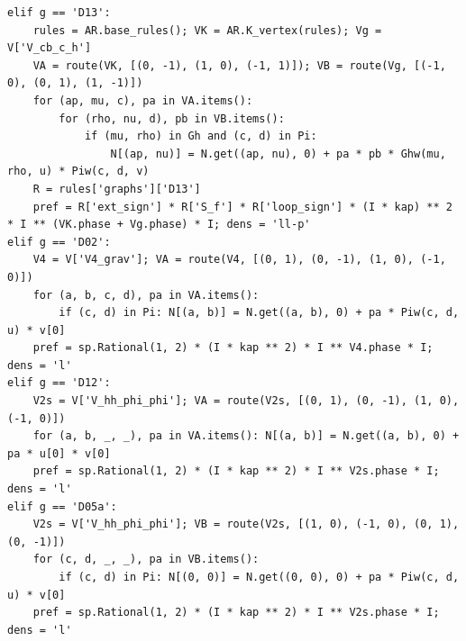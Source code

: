 \documentclass[10pt]{article}
\begin{document}
\begin{lstlisting}
elif g == 'D13':
    rules = AR.base_rules(); VK = AR.K_vertex(rules); Vg = V['V_cb_c_h']
    VA = route(VK, [(0, -1), (1, 0), (-1, 1)]); VB = route(Vg, [(-1, 0), (0, 1), (1, -1)])
    for (ap, mu, c), pa in VA.items():
        for (rho, nu, d), pb in VB.items():
            if (mu, rho) in Gh and (c, d) in Pi:
                N[(ap, nu)] = N.get((ap, nu), 0) + pa * pb * Ghw(mu, rho, u) * Piw(c, d, v)
    R = rules['graphs']['D13']
    pref = R['ext_sign'] * R['S_f'] * R['loop_sign'] * (I * kap) ** 2 * I ** (VK.phase + Vg.phase) * I; dens = 'll-p'
elif g == 'D02':
    V4 = V['V4_grav']; VA = route(V4, [(0, 1), (0, -1), (1, 0), (-1, 0)])
    for (a, b, c, d), pa in VA.items():
        if (c, d) in Pi: N[(a, b)] = N.get((a, b), 0) + pa * Piw(c, d, u) * v[0]
    pref = sp.Rational(1, 2) * (I * kap ** 2) * I ** V4.phase * I; dens = 'l'
elif g == 'D12':
    V2s = V['V_hh_phi_phi']; VA = route(V2s, [(0, 1), (0, -1), (1, 0), (-1, 0)])
    for (a, b, _, _), pa in VA.items(): N[(a, b)] = N.get((a, b), 0) + pa * u[0] * v[0]
    pref = sp.Rational(1, 2) * (I * kap ** 2) * I ** V2s.phase * I; dens = 'l'
elif g == 'D05a':
    V2s = V['V_hh_phi_phi']; VB = route(V2s, [(1, 0), (-1, 0), (0, 1), (0, -1)])
    for (c, d, _, _), pa in VB.items():
        if (c, d) in Pi: N[(0, 0)] = N.get((0, 0), 0) + pa * Piw(c, d, u) * v[0]
    pref = sp.Rational(1, 2) * (I * kap ** 2) * I ** V2s.phase * I; dens = 'l'


\end{lstlisting}
\end{document}
